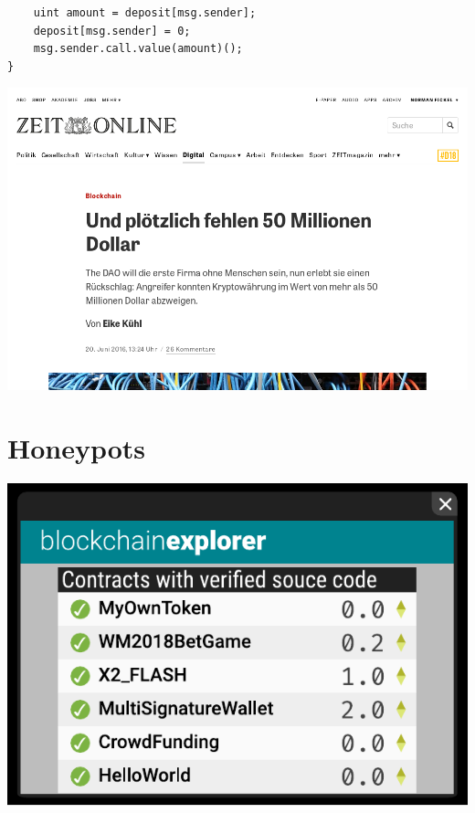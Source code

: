 \documentclass[xcolor=x11names,compress]{beamer}
\begin{document}
\begin{frame}[fragile]
\begin{overprint}
\begin{minipage}[c][0.7\textheight][c]{\textwidth}
\begin{verbatim}
    uint amount = deposit[msg.sender];
    deposit[msg.sender] = 0;
    msg.sender.call.value(amount)();
}
    \end{verbatim}
		\end{minipage}
		\begin{center}
			\vspace{0.2cm}
			\includegraphics[width=\textwidth,height=0.8\textheight,keepaspectratio]{img/daohack/zeitonline.png}
		\end{center}
	\end{overprint}
\end{frame}


\section{Honeypots}

\begin{frame}
	\begin{center}
		\includegraphics[width=\textwidth,height=0.8\textheight,keepaspectratio]{img/blockchainexplorers/01.pdf}
	\end{center}
\end{frame}
\end{document}
